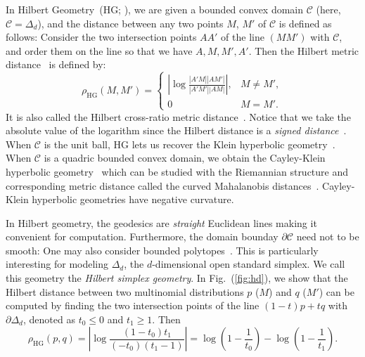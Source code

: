 \documentclass[graybox]{svmult}
\def\calC{\mathcal{C}}
\begin{document}
In Hilbert Geometry~(HG; \cite{Hilbert-1895}), we are given a  bounded convex domain $\calC$ (here, $\calC=\Delta_d$),
and the distance between any two points $M$, $M'$ of $\calC$ is defined as follows:
Consider the two intersection points $AA'$ of the line $(MM')$ with  $\calC$, and order them on the line so that we have $A,M,M',A'$. 
Then the Hilbert metric distance~\cite{Busemann-2011} is defined by:
\begin{equation}\label{eg:hgd}
\rho_{\mathrm{HG}}(M,M')=\left\{
\begin{array}{ll}
\left\vert\log\frac{|A'M| |AM'|}{|A'M'| |AM|}\right\vert, & M \not=M',\\
0 & M=M'.
\end{array}
\right.
\end{equation}
It is also called the Hilbert cross-ratio metric distance~\cite{HilbertHarpe-1991,BH-2014}.
Notice that we take the absolute value of the logarithm since the Hilbert distance is a {\em signed distance}~\cite{Richter-2011}.
When $\calC$ is the unit ball, HG lets us recover the Klein hyperbolic geometry~\cite{BH-2014}.
When $\calC$ is a quadric bounded convex domain, we obtain the Cayley-Klein hyperbolic geometry~\cite{CKM-2015} which can be studied with the Riemannian structure and corresponding metric distance  called the curved Mahalanobis distances~\cite{LMNN-2016,CayleyClassification-2016}.
Cayley-Klein hyperbolic geometries have negative curvature.

In Hilbert geometry, the geodesics are {\em straight} Euclidean lines making it convenient for computation.
Furthermore, the domain bounday $\partial\calC$ need not to be smooth: One may also consider bounded polytopes~\cite{HGPolytope-2009}.
This is particularly interesting for modeling $\Delta_d$, the $d$-dimensional open standard simplex.
We call this geometry the \emph{Hilbert simplex geometry}.
In Fig.~(\ref{fig:hd}), we show that the Hilbert distance between two multinomial distributions
$p$ ($M$) and $q$ ($M'$) can be computed by
finding the two intersection points of the line $(1-t)p+tq$ with
$\partial\Delta_d$, denoted as $t_0\le0$ and $t_1\ge1$. Then 
$$
\rho_{\mathrm{HG}}(p,q)=\left\vert\log\frac{(1-t_0)t_1}{(-t_0)(t_1-1)}\right\vert
=\log\left(1-\frac{1}{t_0}\right)-\log\left(1-\frac{1}{t_1}\right).
$$
\end{document}

